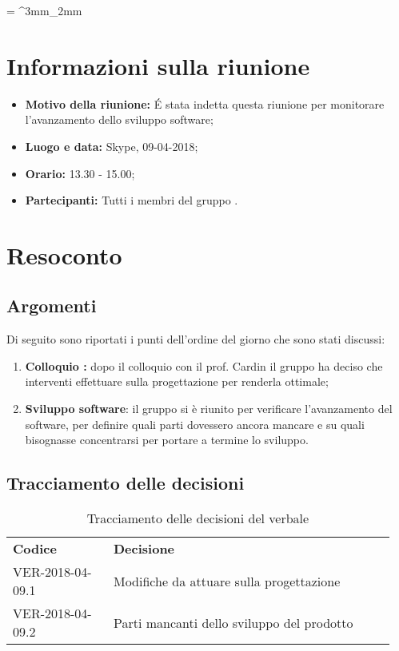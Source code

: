 \documentclass[VER-2018-04-09.tex]{subfiles}
\begin{document}
\tabulinesep = ^3mm_2mm
\chapter{Informazioni sulla riunione}
\begin{itemize}
	\item \textbf{Motivo della riunione:} \'E stata indetta questa riunione per monitorare l'avanzamento dello sviluppo software;
	\item \textbf{Luogo e data:} Skype, 09-04-2018;
	\item \textbf{Orario:} 13.30 - 15.00;
	\item \textbf{Partecipanti:} Tutti i membri del gruppo \gruppo.
\end{itemize}



\chapter{Resoconto}
\section{Argomenti}
Di seguito sono riportati i punti dell'ordine del giorno che sono stati discussi:
\begin{enumerate}
	\item \textbf{Colloquio \pb:} dopo il colloquio con il prof. Cardin il gruppo ha deciso che interventi effettuare sulla progettazione per renderla ottimale;
	\item \textbf{Sviluppo software}: il gruppo si è riunito per verificare l'avanzamento del software, per definire quali parti dovessero ancora mancare e su quali bisognasse concentrarsi per portare a termine lo sviluppo.
\end{enumerate}
\section{Tracciamento delle decisioni}
\begin{table}[H]
	\begin{center}
		\begin{tabu} to 
			\tableHeaderStyle
			\textbf{Codice} & \textbf{Decisione} \\
			VER-2018-04-09.1 & Modifiche da attuare sulla progettazione \\
			VER-2018-04-09.2 & Parti mancanti dello sviluppo del prodotto \\
		\end{tabu}
		\caption{Tracciamento delle decisioni del verbale}
	\end{center}
\end{table}
\end{document}
